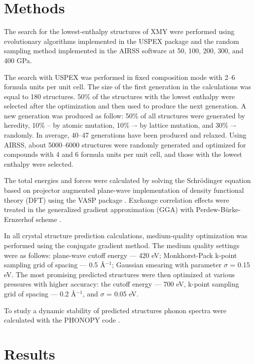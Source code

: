 \documentclass[a4paperm]{article}
\begin{document}
		\section{Methods}
The search for the lowest-enthalpy structures of XMY were performed using evolutionary algorithms implemented in the USPEX package \cite{uspex1,uspex2,uspex3} and the random sampling method implemented in the AIRSS software \cite{airss1,airss2} at 50, 100, 200, 300, and 400 GPa.

The search with USPEX was performed in fixed composition mode with 2--6 formula units per unit cell.
The size of the first generation in the calculations was equal to 180 structures.
50\% of the structures with the lowest enthalpy were selected after the optimization and then used to produce the next generation.
A new generation was produced as follow: 50\% of all structures were generated by heredity, 10\% -- by atomic mutation, 10\% –- by lattice mutation, and 30\% –- randomly.
In average, 40--47 generations have been produced and relaxed.
Using AIRSS, about 5000--6000 structures were randomly generated and optimized for compounds with 4 and 6 formula units per unit cell, and those with the lowest enthalpy were selected.

The total energies and forces were calculated by solving the Schr\"{o}dinger equation based on projector augmented plane-wave implementation of density functional theory (DFT) using the VASP package \cite{vasp1,vasp2}.
Exchange correlation effects were treated in the generalized gradient approximation (GGA) with Perdew-B\"{u}rke-Ernzerhof scheme \cite{pbe}.

In all crystal structure prediction calculations, medium-quality optimization was performed using the conjugate gradient method.
The medium quality settings were as follows: plane-wave cutoff energy --- 420 eV; Monkhorst-Pack k-point sampling grid of spacing --- 0.5 \AA$^{-1}$; Gaussian smearing with parameter $\sigma$ = 0.15 eV.
The most promising predicted structures were then optimized at various pressures with higher accuracy: the cutoff energy --- 700 eV, k-point sampling grid of spacing --- 0.2 \AA$^{-1}$, and $\sigma$ = 0.05 eV.

To study a dynamic stability of predicted structures phonon spectra were calculated with the PHONOPY code \cite{phonopy}.


			\section{Results}
\end{document}
